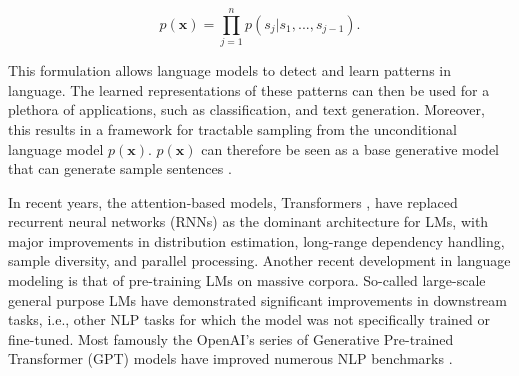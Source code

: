\begin{equation}
    p(\textbf{x}) = \prod_{j = 1}^n  p(s_j | s_1, ..., s_{j - 1}).
\end{equation}

This formulation allows language models to detect and learn patterns in language. The learned representations of these patterns can then be used for a plethora of applications, such as classification, and text generation. Moreover, this results in a framework for tractable sampling from the unconditional language model $p(\textbf{x})$. $p(\textbf{x})$ can therefore be seen as a base generative model that can generate sample sentences \citep{dathathri2019plug}.

In recent years, the attention-based models, Transformers \citep{vaswani2017attention}, have replaced recurrent neural networks (RNNs) as the dominant architecture for LMs, with major improvements in distribution estimation, long-range dependency handling, sample diversity, and parallel processing. Another recent development in language modeling is that of pre-training LMs on massive corpora. So-called large-scale general purpose LMs have demonstrated significant improvements in downstream tasks, i.e., other NLP tasks for which the model was not specifically trained or fine-tuned. Most famously the OpenAI's series of Generative Pre-trained Transformer (GPT) models have improved numerous NLP benchmarks \citep{radford2018improving,radford2019language, brown2020language}. 




